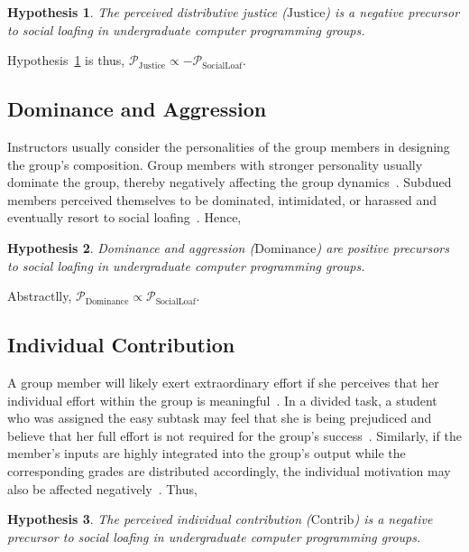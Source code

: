 \documentclass[a4paper,a4paper,BCOR12mm,12pt,abstracton,pointednumbers,tablecaptionabove,footinclude,halfparskip,normalheadings,]{scrartcl}
\newcommand{\PERCEPT}{\mathcal{P}}
\newcommand{\SOCLOAF}{\mathrm{SocialLoaf}}
\newcommand{\JUSTICE}{\mathrm{Justice}}
\newcommand{\CONTRIB}{\mathrm{Contrib}}
\newcommand{\DOMINANCE}{\mathrm{Dominance}}
\newtheorem{hypothesis}{Hypothesis}
\begin{document}
\begin{hypothesis}
The perceived distributive justice ($\JUSTICE$) is a negative precursor to social loafing in undergraduate computer programming groups.\label{hyp:justice}
\end{hypothesis}

Hypothesis~\ref{hyp:justice} is thus, $\PERCEPT_\JUSTICE \propto -\PERCEPT_\SOCLOAF$.

\subsection{Dominance and Aggression}

Instructors usually consider the personalities of the group members in designing the group's composition. Group members with stronger personality usually dominate the group, thereby negatively affecting the group dynamics~\citep{Palloff03}. Subdued members perceived themselves to be dominated, intimidated, or harassed and eventually resort to social loafing~\citep{Michaelsen97}. Hence,

\begin{hypothesis}
Dominance and aggression ($\DOMINANCE$) are positive precursors to social loafing in undergraduate computer programming groups.\label{hyp:dominance}
\end{hypothesis}

Abstractlly, $\PERCEPT_\DOMINANCE \propto \PERCEPT_\SOCLOAF$.

\subsection{Individual Contribution}

A group member will likely exert extraordinary effort if she perceives that her individual effort within the group is meaningful~\citep{Karau93}. In a divided task, a student who was assigned the easy subtask may feel that she is being prejudiced and believe that her full effort is not required for the group's success~\citep{Liden04}. Similarly, if the member's inputs are highly integrated into the group's output while the corresponding grades are distributed accordingly, the individual motivation may also be affected negatively~\citep{Lawler71}. Thus,

\begin{hypothesis}
The perceived individual contribution ($\CONTRIB$) is a negative precursor to social loafing in undergraduate computer programming groups.\label{hyp:contrib}
\end{hypothesis}
\end{document}
